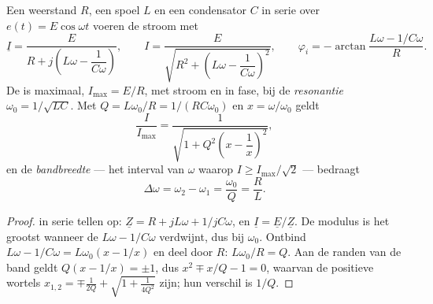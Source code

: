 \begin{theorem}[Stroomresonantie]\label{thm:b1:sinusoidal-impedance:resonance}
Een weerstand $R$, een spoel $L$ en een condensator $C$ in serie over
$e(t) = E\cos\omega t$ voeren de stroom met 
\[
\underline I = \frac{E}{R + j\left(L\omega - \dfrac{1}{C\omega}\right)},
\qquad
I = \frac{E}{\sqrt{R^2 + \left(L\omega - \dfrac{1}{C\omega}\right)^2}},
\qquad
\varphi_i = -\arctan\frac{L\omega - 1/C\omega}{R} .
\]
De  is maximaal, $I_{\max} = E/R$, met stroom en  in
fase, bij de \emph{resonantie} $\omega_0 = 1/\sqrt{LC}$. Met
$Q = L\omega_0/R = 1/(RC\omega_0)$ en $x = \omega/\omega_0$ geldt
\[
\frac{I}{I_{\max}} = \frac{1}{\sqrt{1 + Q^2\left(x - \dfrac1x\right)^2}} ,
\]
en de \emph{bandbreedte} --- het interval van $\omega$ waarop
$I \geq I_{\max}/\sqrt2$ --- bedraagt
\[
\Delta\omega = \omega_2 - \omega_1 = \frac{\omega_0}{Q} = \frac{R}{L} .
\]
\end{theorem}

\begin{proof}
 in serie tellen op: $\underline Z = R + jL\omega + 1/jC\omega$, en
$\underline I = \underline E/\underline Z$. De modulus is het grootst wanneer
de  $L\omega - 1/C\omega$ verdwijnt, dus bij $\omega_0$.
Ontbind $L\omega - 1/C\omega = L\omega_0(x - 1/x)$ en deel door $R$:
$L\omega_0/R = Q$. Aan de randen van de band geldt $Q(x - 1/x) = \pm 1$, dus
$x^2 \mp x/Q - 1 = 0$, waarvan de positieve wortels $x_{1,2} = \mp\frac{1}{2Q}
+ \sqrt{1 + \frac{1}{4Q^2}}$ zijn; hun verschil is $1/Q$.
\end{proof}

